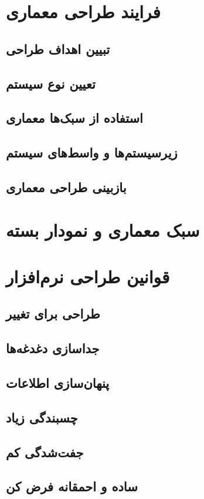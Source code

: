 \documentclass[12pt,svgnames,oneside]{book}
\begin{document}
		\section{فرایند طراحی معماری}
			\subsection{تبیین اهداف طراحی}
			\subsection{تعیین نوع سیستم}
			\subsection{استفاده از سبک‌ها معماری}
			\subsection{زیرسیستم‌‌ها و واسط‌های سیستم}
			\subsection{بازبینی طراحی معماری}
		\section{سبک‌ معماری و نمودار بسته}
		\section{قوانین طراحی نرم‌افزار}
			\subsection{طراحی برای تغییر}
			\subsection{جداسازی دغدغه‌ها}
			\subsection{پنهان‌سازی اطلاعات}
			\subsection{چسبندگی زیاد}
			\subsection{جفت‌شدگی کم}
			\subsection{ساده و احمقانه فرض کن}
			
\end{document}
